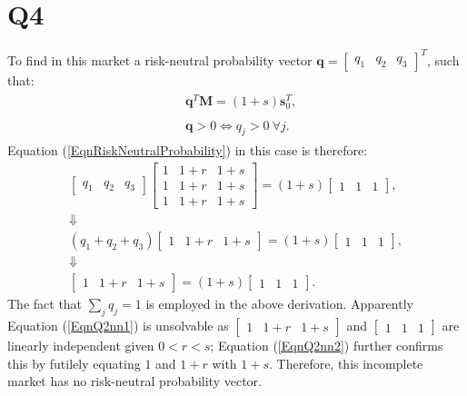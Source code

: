 \documentclass[final,3p,times]{elsarticle}
\begin{document}
\section{Q4}
	To find in this market a risk-neutral probability vector $\mathbf{q}=\begin{bmatrix} q_1 & q_2 & q_3\end{bmatrix}^T$, such that:
	\begin{subequations}
		\begin{align}
			\begin{split}
				\label{EqnRiskNeutralProbability}
				&\mathbf{q}^T \mathbf{M} = \left( 1+s \right) \mathbf{s}_0^T
				,
			\end{split}\\
			\begin{split}
				&\mathbf{q}>0 \iff q_j>0~\forall j
				.
			\end{split}
		\end{align}
	\end{subequations}
	Equation (\ref{EqnRiskNeutralProbability}) in this case is therefore:
	\begin{gather}
		\begin{bmatrix} q_1 & q_2 & q_3 \end{bmatrix}
		\begin{bmatrix} 1 & 1+r & 1+s \\ 1 & 1+r & 1+s \\ 1 & 1+r & 1+s \end{bmatrix}
		=
		\left(1+s\right) \begin{bmatrix} 1 & 1 & 1 \end{bmatrix},\nonumber\\
		\Downarrow\nonumber\\
		\label{EqnQ2nn1}
		\left( q_1 + q_2 + q_3 \right) \begin{bmatrix} 1 & 1+r & 1+s \end{bmatrix} = \left(1+s\right) \begin{bmatrix} 1 & 1 & 1 \end{bmatrix},\\
		\Downarrow\nonumber\\
		\label{EqnQ2nn2}
		\begin{bmatrix} 1 & 1+r & 1+s \end{bmatrix} = \left(1+s\right) \begin{bmatrix} 1 & 1 & 1 \end{bmatrix}.
	\end{gather}
	The fact that $\sum_{j} q_j = 1$ is employed in the above derivation. Apparently Equation (\ref{EqnQ2nn1}) is unsolvable as $\begin{bmatrix} 1 & 1+r & 1+s \end{bmatrix}$ and $\begin{bmatrix} 1 & 1 & 1 \end{bmatrix}$ are linearly independent given $0<r<s$; Equation (\ref{EqnQ2nn2}) further confirms this by futilely equating $1$ and $1+r$ with $1+s$. Therefore, this incomplete market has no risk-neutral probability vector.
	
\end{document}
